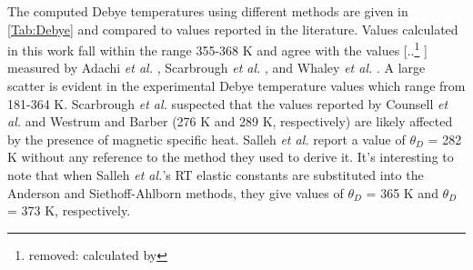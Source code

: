 \documentclass[preprint, 12pt]{elsarticle}
\providecommand{\DIFaddtex}[1]{{\protect\color{blue} \sf #1}} %
\providecommand{\DIFdeltex}[1]{{\protect\color{red} [..\footnote{removed: #1} ]}} %
\providecommand{\DIFaddbegin}{} %
\providecommand{\DIFaddend}{} %
\providecommand{\DIFdelbegin}{} %
\providecommand{\DIFdelend}{} %
\providecommand{\DIFadd}[1]{\texorpdfstring{\DIFaddtex{#1}}{#1}} %
\providecommand{\DIFdel}[1]{\texorpdfstring{\DIFdeltex{#1}}{}} %
\newcommand{\DIFscaledelfig}{0.5}
\newlength{\DIFdelgraphicswidth} %
\newlength{\DIFdelgraphicsheight} %
\newcommand{\DIFaddincludegraphics}[2][]{{\color{blue}\fbox{\DIFOincludegraphics[#1]{#2}}}} %
\newcommand{\DIFdelincludegraphics}[2][]{%
\sbox{\DIFdelgraphicsbox}{\DIFOincludegraphics[#1]{#2}}%
\settoboxwidth{\DIFdelgraphicswidth}{\DIFdelgraphicsbox} %
\settoboxtotalheight{\DIFdelgraphicsheight}{\DIFdelgraphicsbox} %
\scalebox{\DIFscaledelfig}{%
\parbox[b]{\DIFdelgraphicswidth}{\usebox{\DIFdelgraphicsbox}\\[-\baselineskip] \rule{\DIFdelgraphicswidth}{0em}}\llap{\resizebox{\DIFdelgraphicswidth}{\DIFdelgraphicsheight}{%
\setlength{\unitlength}{\DIFdelgraphicswidth}%
\begin{picture}(1,1)%
\thicklines\linethickness{2pt} %
{\color[rgb]{1,0,0}\put(0,0){\framebox(1,1){}}}%
{\color[rgb]{1,0,0}\put(0,0){\line( 1,1){1}}}%
{\color[rgb]{1,0,0}\put(0,1){\line(1,-1){1}}}%
\end{picture}%
}\hspace*{3pt}}} %
} %
\DeclareRobustCommand{\DIFaddbegin}{\DIFOaddbegin \let\includegraphics\DIFaddincludegraphics} %
\DeclareRobustCommand{\DIFaddend}{\DIFOaddend \let\includegraphics\DIFOincludegraphics} %
\DeclareRobustCommand{\DIFdelbegin}{\DIFOdelbegin \let\includegraphics\DIFdelincludegraphics} %
\DeclareRobustCommand{\DIFdelend}{\DIFOaddend \let\includegraphics\DIFOincludegraphics} %
\begin{document}
The computed Debye temperatures using different methods are given in \cref{Tab:Debye} and compared to values reported in the literature. Values calculated in this work fall within the range 355-368 K and agree with the values \DIFdelbegin \DIFdel{calculated by }\DIFdelend \DIFaddbegin \DIFadd{measured by Adachi \textit{et al.} \cite{Adachi2009}, }\DIFaddend Scarbrough \textit{et al.} \cite{Scarbrough1968}\DIFaddbegin \DIFadd{, }\DIFaddend and Whaley \textit{et al.} \cite{Whaley1969}. A large scatter is evident in the experimental Debye temperature values which range from 181-364 K. Scarbrough \textit{et al.} \cite{Scarbrough1968} suspected that the values reported by Counsell \textit{et al.} \cite{Counsell1964} and Westrum and Barber \cite{Westrum1966} (276 K and 289 K, respectively) are likely affected by the presence of magnetic specific heat. Salleh \textit{et al.} \cite{Salleh1986} report a value of $\theta_D$ = 282 K without any reference to the method they used to derive it. It's interesting to note that when Salleh \textit{et al.}'s RT elastic constants are substituted into the Anderson and Siethoff-Ahlborn methods, they give values of $\theta_D$ = 365 K and $\theta_D$ = 373 K, respectively.
\end{document}
